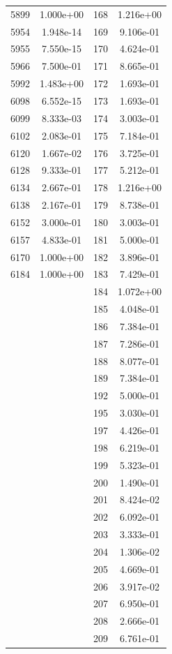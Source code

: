 \documentclass[12pt]{article}
\begin{document}
\begin{longtable}{@{}cccc@{}}
5899 & 1.000e+00 & 168 & 1.216e+00 \\
5954 & 1.948e-14 & 169 & 9.106e-01 \\
5955 & 7.550e-15 & 170 & 4.624e-01 \\
5966 & 7.500e-01 & 171 & 8.665e-01 \\
5992 & 1.483e+00 & 172 & 1.693e-01 \\
6098 & 6.552e-15 & 173 & 1.693e-01 \\
6099 & 8.333e-03 & 174 & 3.003e-01 \\
6102 & 2.083e-01 & 175 & 7.184e-01 \\
6120 & 1.667e-02 & 176 & 3.725e-01 \\
6128 & 9.333e-01 & 177 & 5.212e-01 \\
6134 & 2.667e-01 & 178 & 1.216e+00 \\
6138 & 2.167e-01 & 179 & 8.738e-01 \\
6152 & 3.000e-01 & 180 & 3.003e-01 \\
6157 & 4.833e-01 & 181 & 5.000e-01 \\
6170 & 1.000e+00 & 182 & 3.896e-01 \\
6184 & 1.000e+00 & 183 & 7.429e-01 \\
 &  & 184 & 1.072e+00 \\
 &  & 185 & 4.048e-01 \\
 &  & 186 & 7.384e-01 \\
 &  & 187 & 7.286e-01 \\
 &  & 188 & 8.077e-01 \\
 &  & 189 & 7.384e-01 \\
 &  & 192 & 5.000e-01 \\
 &  & 195 & 3.030e-01 \\
 &  & 197 & 4.426e-01 \\
 &  & 198 & 6.219e-01 \\
 &  & 199 & 5.323e-01 \\
 &  & 200 & 1.490e-01 \\
 &  & 201 & 8.424e-02 \\
 &  & 202 & 6.092e-01 \\
 &  & 203 & 3.333e-01 \\
 &  & 204 & 1.306e-02 \\
 &  & 205 & 4.669e-01 \\
 &  & 206 & 3.917e-02 \\
 &  & 207 & 6.950e-01 \\
 &  & 208 & 2.666e-01 \\
 &  & 209 & 6.761e-01 \\

\end{longtable}
\end{document}
